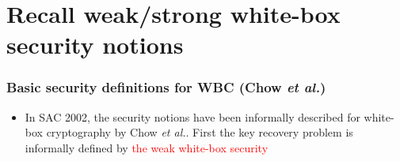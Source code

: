 \documentclass{beamer}
\begin{document}
\section{Recall weak/strong white-box security notions}
\frame
{
\frametitle{Basic security definitions for WBC (Chow \textit{et al.})}
\begin{itemize}
\item In SAC 2002, the security notions have  been informally described for white-box cryptography by Chow \textit{et al.}. First the key recovery problem is informally defined by \textcolor{red}{the weak white-box security}
\end{itemize}


\begin{center}
\end{center}
}
\end{document}
